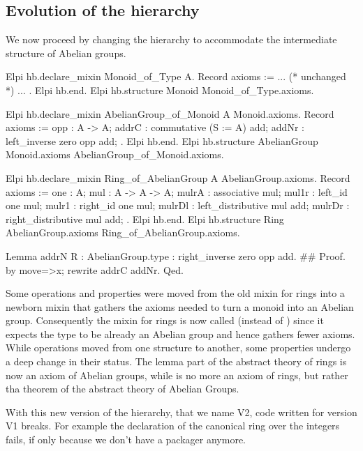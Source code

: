 \documentclass[a4paper,UKenglish,cleveref, autoref]{lipics-v2019}
\newcommand{\mixin}{mixin}
\newcommand{\packager}{packager}
\theoremstyle{implem}
\theoremstyle{implem}
\theoremstyle{axiom}
\theoremstyle{abscommand}
\theoremstyle{command}
\begin{document}
\subsection{Evolution of the hierarchy}\label{subsec:evolution}

We now proceed by changing the hierarchy to accommodate the intermediate
structure of Abelian groups.

\begin{coqcode}
Elpi hb.declare_mixin Monoid_of_Type A.
  Record axioms := { ... (* unchanged *) ... }.
Elpi hb.end.
Elpi hb.structure Monoid Monoid_of_Type.axioms.

Elpi hb.declare_mixin AbelianGroup_of_Monoid A Monoid.axioms.
  Record axioms := {
    opp : A -> A;
    addrC : commutative (S := A) add;
    addNr : left_inverse zero opp add;
  }.
Elpi hb.end.
Elpi hb.structure AbelianGroup Monoid.axioms AbelianGroup_of_Monoid.axioms.

Elpi hb.declare_mixin Ring_of_AbelianGroup A AbelianGroup.axioms.
  Record axioms := {
    one : A;
    mul : A -> A -> A;
    mulrA : associative mul;
    mul1r : left_id one mul;
    mulr1 : right_id one mul;
    mulrDl : left_distributive mul add;
    mulrDr : right_distributive mul add;
  }.
Elpi hb.end.
Elpi hb.structure Ring AbelianGroup.axioms Ring_of_AbelianGroup.axioms.

Lemma addrN {R : AbelianGroup.type} : right_inverse zero opp add.               #\label{demo2:proof:addrN}#
Proof. by move=>x; rewrite addrC addNr. Qed.
\end{coqcode}

Some operations and properties were moved from the old \mixin{} for rings
into a newborn \mixin{}  that gathers the
axioms needed to turn a monoid into an Abelian group. Consequently the \mixin{}
for rings is now called  (instead of )
since it expects the type  to be already an Abelian group and hence
gathers fewer axioms. \\
While operations moved from one structure to another, some properties
undergo a deep change in their status.
The lemma  part of the abstract theory of
rings is now an axiom of Abelian groups, while  is no more
an axiom of rings, but rather tha theorem of the abstract theory of Abelian
Groups.

With this new version of the hierarchy, that we name V2, code written
for version V1 breaks. For example the declaration of the canonical ring over 
the integers fails, if only
because we don't have a  \packager{} anymore.
\end{document}
